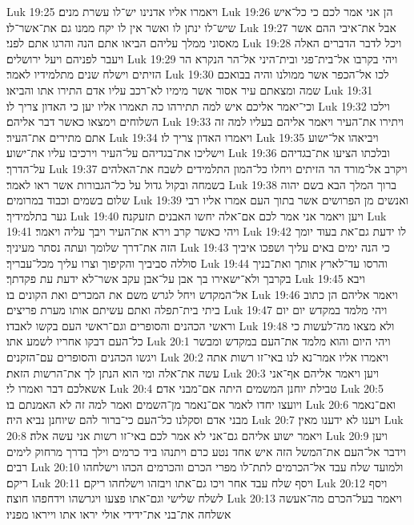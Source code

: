 Luk 19:25  ויאמרו אליו אדנינו יש־לו עשרת מנים׃
Luk 19:26  הן אני אמר לכם כי כל־איש שיש־לו ינתן לו ואשר אין לו יקח ממנו גם את־אשר־לו׃
Luk 19:27  אבל את־איבי ההם אשר מאסוני ממלך עליהם הביאו אתם הנה והרגו אתם לפני׃
Luk 19:28  ויכל לדבר הדברים האלה ויעבר לפניהם ויעל ירושלים׃
Luk 19:29  ויהי בקרבו אל־בית־פגי ובית־היני אל־הר הנקרא הר הזיתים וישלח שנים מתלמידיו לאמר׃
Luk 19:30  לכו אל־הכפר אשר ממולנו והיה בבואכם שמה ומצאתם עיר אסור אשר מימיו לא־רכב עליו אדם התירו אתו והביאו׃
Luk 19:31  וכי־יאמר אליכם איש למה תתירהו כה תאמרו אליו יען כי האדון צריך לו׃
Luk 19:32  וילכו השלוחים וימצאו כאשר דבר אליהם׃
Luk 19:33  ויתירו את־העיר ויאמר אליהם בעליו למה זה אתם מתירים את־העיר׃
Luk 19:34  ויאמרו האדון צריך לו׃
Luk 19:35  ויביאהו אל־ישוע וישליכו את־בגדיהם על־העיר וירכיבו עליו את־ישוע׃
Luk 19:36  ובלכתו הציעו את־בגדיהם על־הדרך׃
Luk 19:37  ויקרב אל־מורד הר הזיתים ויחלו כל־המון התלמידים לשבח את־האלהים בשמחה ובקול גדול על כל־הגבורות אשר ראו לאמר׃
Luk 19:38  ברוך המלך הבא בשם יהוה שלום בשמים וכבוד במרומים׃
Luk 19:39  ואנשים מן הפרושים אשר בתוך העם אמרו אליו רבי גער בתלמידיך׃
Luk 19:40  ויען ויאמר אני אמר לכם אם־אלה יחשו האבנים תזעקנה׃
Luk 19:41  ויהי כאשר קרב וירא את־העיר ויבך עליה ויאמר׃
Luk 19:42  לו ידעת גם־את בעוד יומך הזה את־דרך שלומך ועתה נסתר מעיניך׃
Luk 19:43  כי הנה ימים באים עליך ושפכו איביך סוללה סביביך והקיפוך וצרו עליך מכל־עבריך׃
Luk 19:44  והרסו עד־לארץ אותך ואת־בניך בקרבך ולא־ישאירו בך אבן על־אבן עקב אשר־לא ידעת עת פקדתך׃
Luk 19:45  ויבא אל־המקדש ויחל לגרש משם את המכרים ואת הקונים בו׃
Luk 19:46  ויאמר אליהם הן כתוב ביתי בית־תפלה ואתם עשיתם אותו מערת פריצים׃
Luk 19:47  ויהי מלמד במקדש יום יום וראשי הכהנים והסופרים וגם־ראשי העם בקשו לאבדו׃
Luk 19:48  ולא מצאו מה־לעשות כי כל־העם דבקו אחריו לשמע אתו׃
Luk 20:1  ויהי היום והוא מלמד את־העם במקדש ומבשר ויגשו הכהנים והסופרים עם־הזקנים׃
Luk 20:2  ויאמרו אליו אמר־נא לנו באי־זו רשות אתה עשה את־אלה ומי הוא הנתן לך את־הרשות הזאת׃
Luk 20:3  ויען ויאמר אליהם אף־אני אשאלכם דבר ואמרו לי׃
Luk 20:4  טבילת יוחנן המשמים היתה אם־מבני אדם׃
Luk 20:5  ויועצו יחדו לאמר אם־נאמר מן־השמים ואמר למה זה לא האמנתם בו׃
Luk 20:6  ואם־נאמר מבני אדם וסקלנו כל־העם כי־ברור להם שיוחנן נביא היה׃
Luk 20:7  ויענו לא ידענו מאין׃
Luk 20:8  ויאמר ישוע אליהם גם־אני לא אמר לכם באי־זו רשות אני עשה אלה׃
Luk 20:9  ויען וידבר אל־העם את־המשל הזה איש אחד נטע כרם ויתנהו ביד כרמים וילך בדרך מרחוק לימים רבים׃
Luk 20:10  ולמועד שלח עבד אל־הכרמים לתת־לו מפרי הכרם והכרמים הכהו וישלחהו ריקם׃
Luk 20:11  ויסף שלח עבד אחר ויכו גם־אתו ויבזהו וישלחהו ריקם׃
Luk 20:12  ויסף לשלח שלישי וגם־אתו פצעו ויגרשהו וידחפהו חוצה׃
Luk 20:13  ויאמר בעל־הכרם מה־אעשה אשלחה את־בני את־ידידי אולי יראו אתו וייראו מפניו׃
